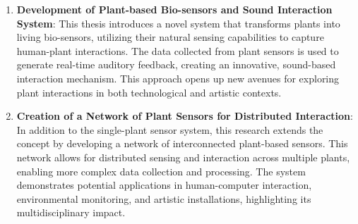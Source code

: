 \begin{enumerate}
    \item \textbf{Development of Plant-based Bio-sensors and Sound Interaction System}: This thesis introduces a novel system that transforms plants into living bio-sensors, utilizing their natural sensing capabilities to capture human-plant interactions. The data collected from plant sensors is used to generate real-time auditory feedback, creating an innovative, sound-based interaction mechanism. This approach opens up new avenues for exploring plant interactions in both technological and artistic contexts.
    \item \textbf{Creation of a Network of Plant Sensors for Distributed Interaction}: In addition to the single-plant sensor system, this research extends the concept by developing a network of interconnected plant-based sensors. This network allows for distributed sensing and interaction across multiple plants, enabling more complex data collection and processing. The system demonstrates potential applications in human-computer interaction, environmental monitoring, and artistic installations, highlighting its multidisciplinary impact.
\end{enumerate}
